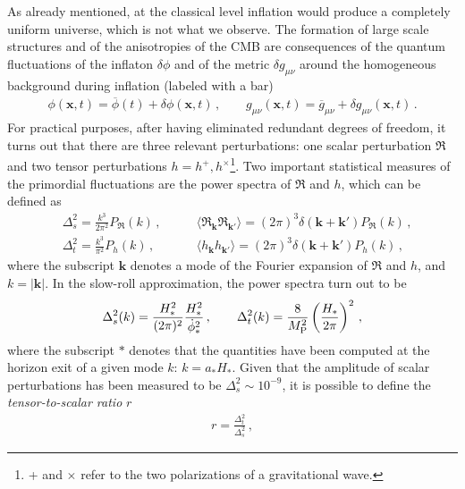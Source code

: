 \documentclass[12pt,a4paper]{book}
\begin{document}
As already mentioned, at the classical level inflation would produce a completely uniform universe, which is not what we observe. The formation of large scale structures and of the anisotropies of the CMB are consequences of the quantum fluctuations of the inflaton $\delta \phi$ and of the metric $\delta g_{\mu \nu}$ around the homogeneous background during inflation (labeled with a bar)
\begin{align}
\label{eq:FieldsFluctuations}
\phi(\mathbf{x}, t) = \overline{\phi}(t) + \delta \phi(\mathbf{x},t) \,, \qquad g_{\mu \nu}(\mathbf{x}, t) = \overline{g}_{\mu \nu} + \delta g_{\mu \nu}(\mathbf{x}, t) \,.
\end{align}
For practical purposes, after having eliminated redundant degrees of freedom, it turns out that there are three relevant perturbations: one scalar perturbation $\mathfrak{R}$ and two tensor perturbations $h = h^+, h^\times$\footnote{+ and $\times$ refer to the two polarizations of a gravitational wave.}. Two important statistical measures of the primordial fluctuations are the power spectra of $\mathfrak{R}$ and $h$, which can be defined as
\begin{align}
\label{eq:PowerSpectraDefinition}
&\Delta_s^2 = \frac{k^3}{2 \pi^2} P_{\mathfrak{R}}(k) \,, \qquad &\langle \mathfrak{R}_{\mathbf{k}} \mathfrak{R}_{\mathbf{k'}} \rangle = (2 \pi)^3 \delta \left(\mathbf{k} + \mathbf{k'}\right) P_{\mathfrak{R}}(k) \,, \\
&\Delta_t^2 = \frac{k^3}{\pi^2} P_h(k) \,, \qquad &\langle h_{\mathbf{k}} h_{\mathbf{k'}} \rangle = (2 \pi)^3 \delta \left(\mathbf{k} + \mathbf{k'}\right) P_h(k) \,,
\end{align}
where the subscript $\mathbf{k}$ denotes a mode of the Fourier expansion of $\mathfrak{R}$ and $h$, and $k = |\mathbf{k}|$. In the slow-roll approximation, the power spectra turn out to be~\cite{Maldacena:2002vr, Weinberg:2005vy}
\begin{align}
\label{eq:PowerSpectra}
\Delta_s^2(k) = \frac{H_*^2}{(2 \pi)^2} \frac{H_*^2}{\dot\phi_*^2} \,, \qquad \Delta_t^2(k) = \frac{8}{M_{\rm P}^2} \left(\frac{H_*}{2 \pi}\right)^2 \,,
\end{align}
where the subscript $*$ denotes that the quantities have been computed at the horizon exit of a given mode $k$: $k = a_* H_*$. Given that the amplitude of scalar perturbations has been measured to be $\Delta_s^2 \sim 10^{-9}$, it is possible to define the \textit{tensor-to-scalar ratio} $r$
\begin{align}
r = \frac{\Delta_t^2}{\Delta_s^2} \,,
\end{align}
\end{document}
